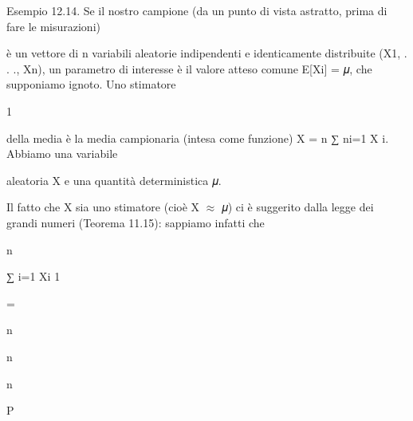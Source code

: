 \documentclass[a4paper,portrait,12pt]{article}
\begin{document}
\begin{flushleft}
Esempio 12.14. Se il nostro campione (da un punto di vista astratto, prima di fare le misurazioni)
\end{flushleft}


\begin{flushleft}
\`{e} un vettore di n variabili aleatorie indipendenti e identicamente distribuite (X1, . . ., Xn), un parametro di interesse \`{e} il valore atteso comune E[Xi] = 𝜇, che supponiamo ignoto. Uno stimatore
\end{flushleft}


1


\begin{flushleft}
della media \`{e} la media campionaria (intesa come funzione) X = n ∑ ni=1 X i. Abbiamo una variabile
\end{flushleft}


\begin{flushleft}
aleatoria X e una quantit\`{a} deterministica 𝜇.
\end{flushleft}


\begin{flushleft}
Il fatto che X sia uno stimatore (cio\`{e} X $\approx$ 𝜇) ci \`{e} suggerito dalla legge dei grandi numeri (Teorema 11.15): sappiamo infatti che
\end{flushleft}


\begin{flushleft}
n
\end{flushleft}


\begin{flushleft}
∑ i=1 Xi 1
\end{flushleft}


=


\begin{flushleft}
n
\end{flushleft}


\begin{flushleft}
n
\end{flushleft}





\begin{flushleft}
n
\end{flushleft}





\begin{flushleft}
P
\end{flushleft}
\end{document}
